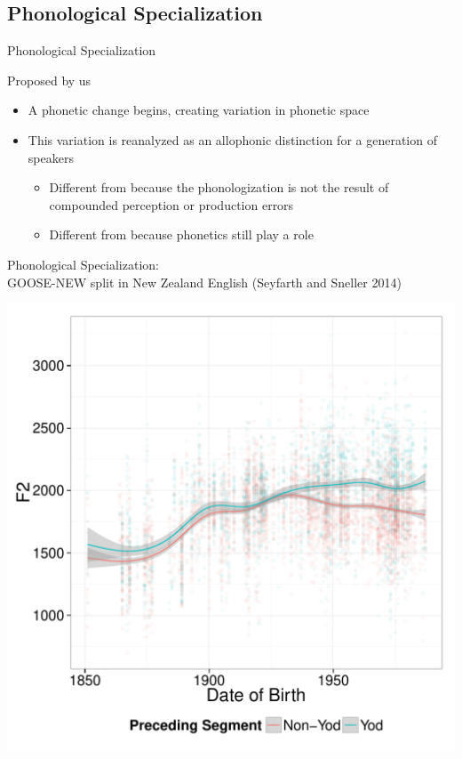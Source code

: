 \documentclass[hyperref={pdfpagelabels=false}]{beamer}
\begin{document}
\subsection{Phonological Specialization}

\begin{frame}{Phonological Specialization}

	Proposed by us \pause
	\begin{itemize}
		\item A phonetic change begins, creating variation in phonetic space \pause
		\item This variation is reanalyzed as an allophonic distinction for a generation of speakers \pause
		\begin{itemize}
				\item Different from \citet{Ohala1981} because the phonologization is not the result of compounded perception or production errors \pause
				\item Different from \citet{fruehwald2013, JandaJoseph2003} because phonetics still play a role 
		\end{itemize}
	\end{itemize}

\end{frame}

\begin{frame}{Phonological Specialization: \\ \small{GOOSE-NEW split in New Zealand English (Seyfarth and Sneller 2014)}}

\begin{center}
\includegraphics[width=.8\textwidth,height=.7\textheight]{ByTokenOldPreceding.pdf}
\end{center}
\end{frame}
\end{document}
